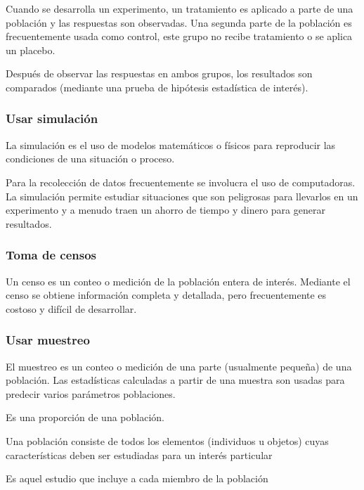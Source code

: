 Cuando se desarrolla un experimento, un tratamiento es aplicado a parte de una población y las respuestas son observadas. Una segunda parte de la población es frecuentemente usada como control, este grupo no recibe tratamiento o se aplica un placebo.

Después de observar las respuestas en ambos grupos, los resultados son comparados (mediante una prueba de hipótesis estadística de interés).

\subsubsection{Usar simulación}

La simulación es el uso de modelos matemáticos o físicos para reproducir las condiciones de una situación o proceso.

Para la recolección de datos frecuentemente se involucra el uso de computadoras. La simulación permite estudiar situaciones que son peligrosas para llevarlos en un experimento y a menudo
traen un ahorro de tiempo y dinero para generar resultados.

\subsubsection{Toma de censos}

Un censo es un conteo o medición de la población entera de interés. Mediante el censo se obtiene información completa y detallada, pero frecuentemente es costoso y difícil de desarrollar.

\subsubsection{Usar muestreo}

El muestreo es un conteo o medición de una parte (usualmente pequeña) de una población. Las estadísticas calculadas a partir de una muestra son usadas para predecir varios parámetros poblaciones.

\begin{definition}[Muestra]
    Es una proporción de una población.
\end{definition}

\begin{definition}[Población]
    Una población consiste de todos los elementos (individuos u objetos) cuyas características deben ser estudiadas para un interés particular
\end{definition}

\begin{definition}[Censo]
    Es aquel estudio que incluye a cada miembro de la población
\end{definition}

